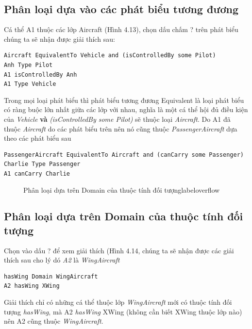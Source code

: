 \subsection{Phân loại dựa vào các phát biểu tương đương} 
Cá thể A1 thuộc các lớp Aircraft (Hình 4.13), chọn dấu chấm ? trên phát biểu chúng ta sẽ nhận được giải thích sau:
\begin{verbatim}
Aircraft EquivalentTo Vehicle and (isControlledBy some Pilot)
Anh Type Pilot
A1 isControlledBy Anh
A1 Type Vehicle
\end{verbatim}
Trong mọi loại phát biểu thì phát biểu tương đương Equivalent là loại phát biểu có ràng buộc lớn nhất giữa các lớp với nhau, nghĩa là một cá thể hội đủ điều kiện của \textit{Vehicle} \textbf{và} \textit{(isControlledBy some Pilot)} sẽ thuộc loại \textit{Aircraft}. Do A1 đã thuộc \textit{Aircraft} do các phát biểu trên nên nó cũng thuộc \textit{PassengerAircraft} dựa theo các phát biểu sau
 \begin{verbatim}
PassengerAircraft EquivalentTo Aircraft and (canCarry some Passenger)
Charlie Type Passenger
A1 canCarry Charlie
\end{verbatim}
\begin{figure}[h!]
	\centering
	\caption{Phân loại dựa trên Domain của thuộc tính đối tượnglabel{overflow}}
\end{figure}
\subsection{Phân loại dựa trên Domain của thuộc tính đối tượng} 
Chọn vào dấu ? để xem giải thích (Hình 4.14, chúng ta sẽ nhận được các giải thích sau cho lý dó \textit{A2} là \textit{WingAircraft}
\begin{verbatim}
hasWing Domain WingAircraft
A2 hasWing XWing
\end{verbatim}
Giải thích chỉ có những cá thể thuộc lớp \textit{WingAircraft} mới có thuộc tính đối tượng \textit{hasWing}, mà A2 \textit{hasWing} XWing (không cần biết XWing thuộc lớp nào) nên A2 cũng thuộc \textit{WingAircraft}.
